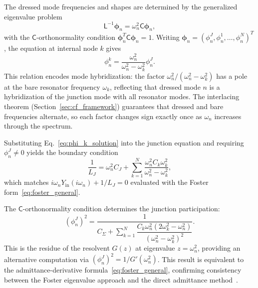 \documentclass[reprint, floatfix, superscriptaddress, amsmath, amssymb, longbibliography]{revtex4-2}
\newcommand{\Yin}{Y_{\mathrm{in}}}
\begin{document}
The dressed mode frequencies and shapes are determined by the generalized eigenvalue problem
\begin{equation}
\mathsf{L}^{-1} \boldsymbol{\phi}_n = \omega_n^2 \mathsf{C} \boldsymbol{\phi}_n,
\label{eq:gep}
\end{equation}
with the $\mathsf{C}$-orthonormality condition $\boldsymbol{\phi}_n^T \mathsf{C} \boldsymbol{\phi}_n = 1$. Writing $\boldsymbol{\phi}_n = (\phi_n^J, \phi_n^1, \ldots, \phi_n^N)^T$, the equation at internal node $k$ gives
\begin{equation}
\phi_n^k = \frac{\omega_n^2}{\omega_n^2 - \omega_k^2} \phi_n^J.
\label{eq:phi_k_solution}
\end{equation}
This relation encodes mode hybridization: the factor $\omega_n^2/(\omega_n^2 - \omega_k^2)$ has a pole at the bare resonator frequency $\omega_k$, reflecting that dressed mode $n$ is a hybridization of the junction mode with all resonator modes. The interlacing theorem (Section~\ref{sec:cf_framework}) guarantees that dressed and bare frequencies alternate, so each factor changes sign exactly once as $\omega_n$ increases through the spectrum.

Substituting Eq.~\eqref{eq:phi_k_solution} into the junction equation and requiring $\phi_n^J \neq 0$ yields the boundary condition
\begin{equation}
\frac{1}{L_J} = \omega_n^2 C_J + \sum_{k=1}^{N} \frac{\omega_n^2 C_k \omega_k^2}{\omega_n^2 - \omega_k^2},
\label{eq:bc_final_form}
\end{equation}
which matches $i\omega_n\Yin(i\omega_n) + 1/L_J = 0$ evaluated with the Foster form~\eqref{eq:foster_general}.

The $\mathsf{C}$-orthonormality condition determines the junction participation:
\begin{equation}
(\phi_n^J)^2 = \frac{1}{C_\Sigma + \sum_{k=1}^{N} \dfrac{C_k\omega_n^2(2\omega_k^2 - \omega_n^2)}{(\omega_n^2 - \omega_k^2)^2}}.
\label{eq:phi_J_squared}
\end{equation}
This is the residue of the resolvent $G(z)$ at eigenvalue $z = \omega_n^2$, providing an alternative computation via $(\phi_n^J)^2 = 1/G'(\omega_n^2)$. This result is equivalent to the admittance-derivative formula~\eqref{eq:foster_general}, confirming consistency between the Foster eigenvalue approach and the direct admittance method~\cite{Nigg2012, Minev2021}.
\end{document}
